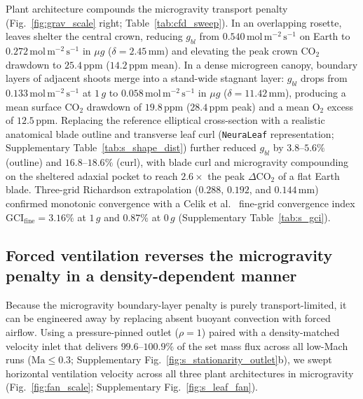 \documentclass[final,5p,times,twocolumn,numbers,sort&compress]{elsarticle}
\newcommand{\molms}{\ensuremath{\mathrm{mol\,m^{-2}\,s^{-1}}}}
\begin{document}
Plant architecture compounds the microgravity transport penalty (Fig.~\ref{fig:grav_scale} right; Table~\ref{tab:cfd_sweep}). In an overlapping rosette, leaves shelter the central crown, reducing $g_{bl}$ from $0.540\,\molms$ on Earth to $0.272\,\molms$ in $\mu g$ ($\delta = 2.45\,\mathrm{mm}$) and elevating the peak crown $\mathrm{CO_2}$ drawdown to $25.4\,\mathrm{ppm}$ ($14.2\,\mathrm{ppm}$ mean). In a dense microgreen canopy, boundary layers of adjacent shoots merge into a stand-wide stagnant layer: $g_{bl}$ drops from $0.133\,\molms$ at $1\,g$ to $0.058\,\molms$ in $\mu g$ ($\delta = 11.42\,\mathrm{mm}$), producing a mean surface $\mathrm{CO_2}$ drawdown of $19.8\,\mathrm{ppm}$ ($28.4\,\mathrm{ppm}$ peak) and a mean $\mathrm{O_2}$ excess of $12.5\,\mathrm{ppm}$. Replacing the reference elliptical cross-section with a realistic anatomical blade outline and transverse leaf curl (\texttt{NeuraLeaf} representation; Supplementary Table~\ref{tab:s_shape_dist}) further reduced $g_{bl}$ by $3.8\text{--}5.6\%$ (outline) and $16.8\text{--}18.6\%$ (curl), with blade curl and microgravity compounding on the sheltered adaxial pocket to reach $2.6\times$ the peak $\Delta\mathrm{CO_2}$ of a flat Earth blade. Three-grid Richardson extrapolation ($0.288$, $0.192$, and $0.144\,\mathrm{mm}$) confirmed monotonic convergence with a Celik et al.~\citep{celik2008} fine-grid convergence index $\mathrm{GCI}_{\text{fine}} = 3.16\%$ at $1\,g$ and $0.87\%$ at $0\,g$ (Supplementary Table~\ref{tab:s_gci}).

\subsection{Forced ventilation reverses the microgravity penalty in a density-dependent manner}\label{sec:ventilation}

Because the microgravity boundary-layer penalty is purely transport-limited, it can be engineered away by replacing absent buoyant convection with forced airflow. Using a pressure-pinned outlet ($\rho = 1$) paired with a density-matched velocity inlet that delivers $99.6\text{--}100.9\%$ of the set mass flux across all low-Mach runs ($\mathrm{Ma}\le 0.3$; Supplementary Fig.~\ref{fig:s_stationarity_outlet}b), we swept horizontal ventilation velocity across all three plant architectures in microgravity (Fig.~\ref{fig:fan_scale}; Supplementary Fig.~\ref{fig:s_leaf_fan}).
\end{document}
